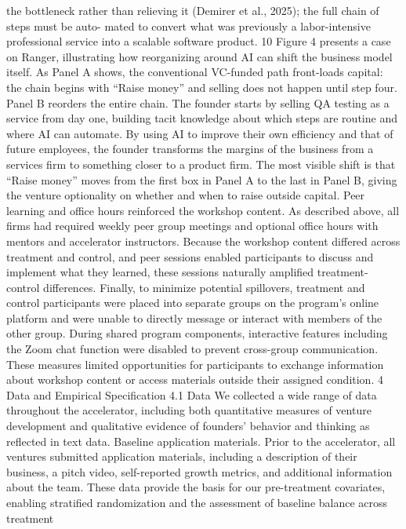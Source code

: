 the bottleneck rather than relieving it (Demirer et al., 2025); the full chain of steps must be auto-
mated to convert what was previously a labor-intensive professional service into a scalable software
product.
10
Figure 4 presents a case on Ranger, illustrating how reorganizing around AI can shift the business
model itself. As Panel A shows, the conventional VC-funded path front-loads capital: the chain
begins with “Raise money” and selling does not happen until step four. Panel B reorders the entire
chain. The founder starts by selling QA testing as a service from day one, building tacit knowledge
about which steps are routine and where AI can automate. By using AI to improve their own
efficiency and that of future employees, the founder transforms the margins of the business from a
services firm to something closer to a product firm. The most visible shift is that “Raise money”
moves from the first box in Panel A to the last in Panel B, giving the venture optionality on whether
and when to raise outside capital.
Peer learning and office hours reinforced the workshop content. As described above, all firms
had required weekly peer group meetings and optional office hours with mentors and accelerator
instructors. Because the workshop content differed across treatment and control, and peer sessions
enabled participants to discuss and implement what they learned, these sessions naturally amplified
treatment-control differences.
Finally, to minimize potential spillovers, treatment and control participants were placed into
separate groups on the program’s online platform and were unable to directly message or interact
with members of the other group. During shared program components, interactive features including
the Zoom chat function were disabled to prevent cross-group communication.
These measures
limited opportunities for participants to exchange information about workshop content or access
materials outside their assigned condition.
4
Data and Empirical Specification
4.1
Data
We collected a wide range of data throughout the accelerator, including both quantitative measures
of venture development and qualitative evidence of founders’ behavior and thinking as reflected in
text data.
Baseline application materials.
Prior to the accelerator, all ventures submitted application
materials, including a description of their business, a pitch video, self-reported growth metrics,
and additional information about the team. These data provide the basis for our pre-treatment
covariates, enabling stratified randomization and the assessment of baseline balance across treatment
